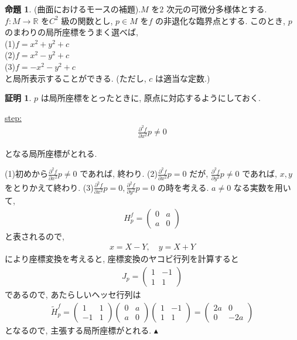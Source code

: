 \documentclass[10pt, fleqn, label-section=none]{bxjsarticle}
\theoremstyle{definition}
\newtheorem{prop}[dfn]{命題}
\newtheorem*{pf*}{証明}
\renewcommand{\;}{\, ; \,}
\newcommand{\gyouretsu}[1]{\begin{pmatrix} #1 \end{pmatrix} }
\newenvironment{claim}[1]{\par\noindent\underline{step:}\space#1}{}
\newenvironment{claimproof}[1]{\par\noindent{($\because$)}\space#1}{\hfill $\blacktriangle $}
\begin{document}
\begin{prop}(曲面におけるモースの補題).$M$ を$2$ 次元の可微分多様体とする. $f: M \rightarrow \mathbb R$ を$C^2$ 級の関数とし, $p \in M$ を$f$ の非退化な臨界点とする. このとき, $p$ のまわりの局所座標をうまく選べば, \\
(1)$f = x^2 + y^2 + c$ \\
(2)$f = x^2 - y^2 + c$ \\
(3)$f = -x^2 -y ^2 + c$ \\
 と局所表示することができる. (ただし, $c$ は適当な定数.) 
\end{prop}
\begin{pf*}

$p$ は局所座標をとったときに, 原点に対応するようにしておく. 

\begin{claim}

\begin{align*} \frac{\partial ^2 f}{\partial x^2 } p \neq 0  \end{align*}

となる局所座標がとれる. 
\end{claim}
\begin{claimproof}
(1)初めから$\frac{\partial ^2 f}{\partial x^2 } p \neq 0 $ であれば, 終わり. (2)$\frac{\partial ^2 f}{\partial x^2 } p = 0 $ だが, $\frac{\partial ^2 f}{\partial y^2 } p \neq 0 $ であれば, $x,y$ をとりかえて終わり. (3)$\frac{\partial ^2 f}{\partial x^2 } p = 0 , \frac{\partial ^2 f}{\partial y^2 } p =  0 $ の時を考える. $a \neq 0$ なる実数を用いて, 
\begin{align*} H^f_p = \gyouretsu{0 & a \\ a& 0} \end{align*}
と表されるので, 
\begin{align*} x = X - Y, \quad y = X + Y \end{align*}
により座標変換を考えると, 座標変換のヤコビ行列を計算すると
\begin{align*} J_p = \gyouretsu{ 1 & -1 \\  1 & 1} \end{align*}
であるので, あたらしいヘッセ行列は
\begin{align*} \tilde H ^f _p = \gyouretsu{ 1 & 1 \\  - 1 & 1} \gyouretsu{0 & a \\ a& 0}  \gyouretsu{ 1 & -1 \\  1 & 1} =  \gyouretsu{ 2a & 0 \\  0 & -2a }  \end{align*}
となるので, 主張する局所座標がとれる. 
\end{claimproof}


\end{pf*}
\end{document}
